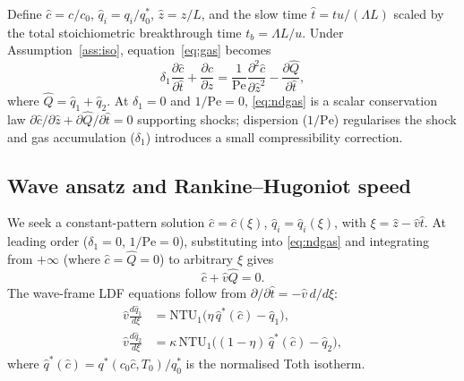 \documentclass[a4paper]{amsart}
\theoremstyle{definition}
\begin{document}
Define $\hat{c}=c/c_0$, $\hat{q}_i=q_i/q_0^*$, $\hat{z}=z/L$, and the slow
time $\hat{t}=tu/(\Lambda L)$ scaled by the total stoichiometric breakthrough
time $t_b=\Lambda L/u$.  Under Assumption~\ref{ass:iso}, equation~\eqref{eq:gas}
becomes
\begin{equation}
  \delta_1\frac{\partial\hat{c}}{\partial\hat{t}}
  + \frac{\partial\hat{c}}{\partial\hat{z}}
  = \frac{1}{\mathrm{Pe}}\frac{\partial^2\hat{c}}{\partial\hat{z}^2}
    - \frac{\partial\hat{Q}}{\partial\hat{t}},
  \label{eq:ndgas}
\end{equation}
where $\hat{Q}=\hat{q}_1+\hat{q}_2$.  At $\delta_1=0$ and
$1/\mathrm{Pe}=0$, \eqref{eq:ndgas} is a scalar conservation law
$\partial\hat{c}/\partial\hat{z}+\partial\hat{Q}/\partial\hat{t}=0$
supporting shocks; dispersion ($1/\mathrm{Pe}$) regularises the shock and
gas accumulation ($\delta_1$) introduces a small compressibility correction.

\subsection{Wave ansatz and Rankine--Hugoniot speed}

We seek a constant-pattern solution
$\hat{c}=\hat{c}(\xi)$, $\hat{q}_i=\hat{q}_i(\xi)$, with
$\xi=\hat{z}-\hat{v}\hat{t}$.
At leading order ($\delta_1=0$, $1/\mathrm{Pe}=0$), substituting into
\eqref{eq:ndgas} and integrating from $+\infty$ (where $\hat{c}=\hat{Q}=0$)
to arbitrary $\xi$ gives
\begin{equation}
  \hat{c} + \hat{v}\hat{Q} = 0.
  \label{eq:rh-integral}
\end{equation}
The wave-frame LDF equations follow from
$\partial/\partial\hat{t}=-\hat{v}\,d/d\xi$:
\begin{align}
  \hat{v}\frac{d\hat{q}_1}{d\xi}
    &= \mathrm{NTU}_1\bigl(\eta\,\hat{q}^*(\hat{c}) - \hat{q}_1\bigr),
  \label{eq:waveq1}\\
  \hat{v}\frac{d\hat{q}_2}{d\xi}
    &= \kappa\,\mathrm{NTU}_1\bigl((1-\eta)\,\hat{q}^*(\hat{c}) - \hat{q}_2\bigr),
  \label{eq:waveq2}
\end{align}
where $\hat{q}^*(\hat{c})=q^*(c_0\hat{c},T_0)/q_0^*$ is the normalised
Toth isotherm.
\end{document}
